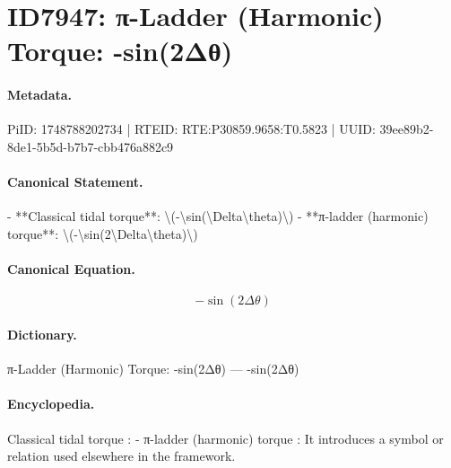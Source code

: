\section*{ID7947: π-Ladder (Harmonic) Torque: -sin(2Δθ)}
\paragraph{Metadata.}
PiID: 1748788202734 | RTEID: RTE:P30859.9658:T0.5823 | UUID: 39ee89b2-8de1-5b5d-b7b7-cbb476a882c9

\paragraph{Canonical Statement.}
- **Classical tidal torque**: \textbackslash{}(-\textbackslash{}sin(\textbackslash{}Delta\textbackslash{}theta)\textbackslash{}) - **π-ladder (harmonic) torque**: \textbackslash{}(-\textbackslash{}sin(2\textbackslash{}Delta\textbackslash{}theta)\textbackslash{})

\paragraph{Canonical Equation.}
\[
-\sin(2\Delta\theta)
\]

\paragraph{Dictionary.}
π-Ladder (Harmonic) Torque: -sin(2Δθ) — -sin(2Δθ)

\paragraph{Encyclopedia.}
Classical tidal torque : - π-ladder (harmonic) torque : It introduces a symbol or relation used elsewhere in the framework.
